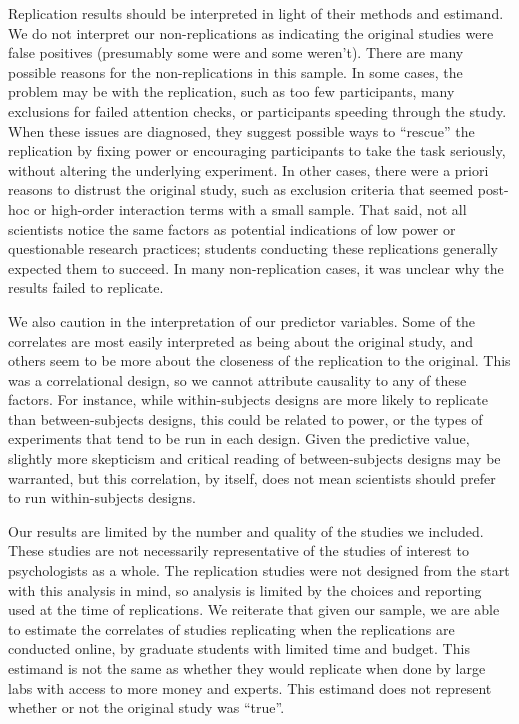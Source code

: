 \documentclass[
  english,
  a4paper,
]{article}
\begin{document}
Replication results should be interpreted in light of their methods and estimand. We do not interpret our non-replications as indicating the original studies were false positives (presumably some were and some weren't). There are many possible reasons for the non-replications in this sample. In some cases, the problem may be with the replication, such as too few participants, many exclusions for failed attention checks, or participants speeding through the study. When these issues are diagnosed, they suggest possible ways to ``rescue'' the replication by fixing power or encouraging participants to take the task seriously, without altering the underlying experiment. In other cases, there were a priori reasons to distrust the original study, such as exclusion criteria that seemed post-hoc or high-order interaction terms with a small sample. That said, not all scientists notice the same factors as potential indications of low power or questionable research practices; students conducting these replications generally expected them to succeed. In many non-replication cases, it was unclear why the results failed to replicate.

We also caution in the interpretation of our predictor variables. Some of the correlates are most easily interpreted as being about the original study, and others seem to be more about the closeness of the replication to the original. This was a correlational design, so we cannot attribute causality to any of these factors. For instance, while within-subjects designs are more likely to replicate than between-subjects designs, this could be related to power, or the types of experiments that tend to be run in each design. Given the predictive value, slightly more skepticism and critical reading of between-subjects designs may be warranted, but this correlation, by itself, does not mean scientists should prefer to run within-subjects designs.

Our results are limited by the number and quality of the studies we included. These studies are not necessarily representative of the studies of interest to psychologists as a whole. The replication studies were not designed from the start with this analysis in mind, so analysis is limited by the choices and reporting used at the time of replications. We reiterate that given our sample, we are able to estimate the correlates of studies replicating when the replications are conducted online, by graduate students with limited time and budget. This estimand is not the same as whether they would replicate when done by large labs with access to more money and experts. This estimand does not represent whether or not the original study was ``true''.
\end{document}
